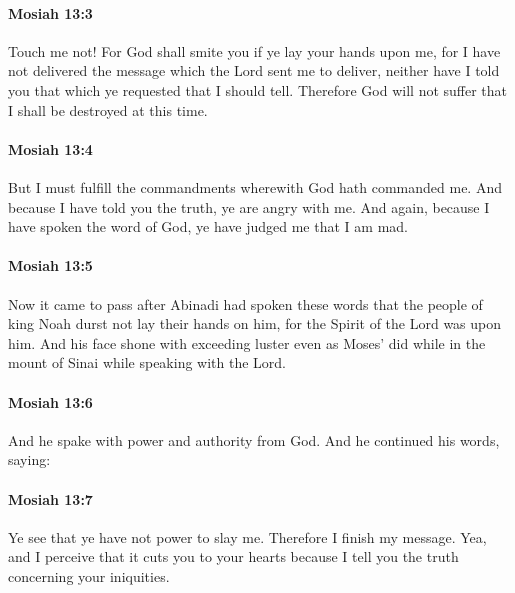 		\paragraph{Mosiah 13:3} %
			\label{MOSIAH-13-3}

			Touch me not!
			For God shall smite you if ye lay your hands upon me,
			for I have not delivered the message which the Lord sent me to deliver,
			neither have I told you that which ye requested that I should tell.
			Therefore God will not suffer that I shall be destroyed at this time.

		\paragraph{Mosiah 13:4} %
			\label{MOSIAH-13-4}

			But I must fulfill the commandments wherewith God hath commanded me.
			And because I have told you the truth, ye are angry with me.
			And again, because I have spoken the word of God,
			ye have judged me that I am mad.

		\paragraph{Mosiah 13:5} %
			\label{MOSIAH-13-5}

			Now it came to pass after Abinadi had spoken these words
			that the people of king Noah durst not lay their hands on him,
			for the Spirit of the Lord was upon him.
			And his face shone with exceeding luster even as Moses' did
			while in the mount of Sinai while speaking with the Lord.

		\paragraph{Mosiah 13:6} %
			\label{MOSIAH-13-6}

			And he spake with power and authority from God.
			And he continued his words, saying:

		\paragraph{Mosiah 13:7} %
			\label{MOSIAH-13-7}

			Ye see that ye have not power to slay me.
			Therefore I finish my message.
			Yea, and I perceive that it cuts you to your hearts
			because I tell you the truth concerning your iniquities.

